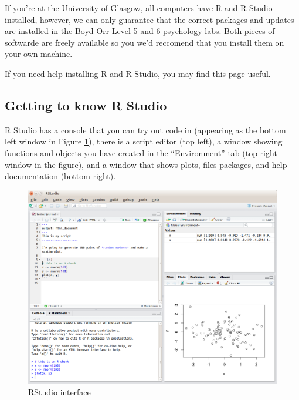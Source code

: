 \documentclass[]{book}
\begin{document}
If you're at the University of Glasgow, all computers have R and R Studio installed, however, we can only guarantee that the correct packages and updates are installed in the Boyd Orr Level 5 and 6 psychology labs. Both pieces of softwarde are freely available so you we'd reccomend that you install them on your own machine.

If you need help installing R and R Studio, you may find \href{https://psyteachr.github.io/hack-your-data/r_instructions.html}{this page} useful.

\hypertarget{getting-to-know-r-studio}{%
\subsection{Getting to know R Studio}\label{getting-to-know-r-studio}}

R Studio has a console that you can try out code in (appearing as the bottom left window in Figure \ref{fig:img-rstudio}), there is a script editor (top left), a window showing functions and objects you have created in the ``Environment'' tab (top right window in the figure), and a window that shows plots, files packages, and help documentation (bottom right).

\begin{figure}

{\centering \includegraphics[width=1\linewidth]{images/rstudio} 

}

\caption{RStudio interface}\label{fig:img-rstudio}
\end{figure}
\end{document}
